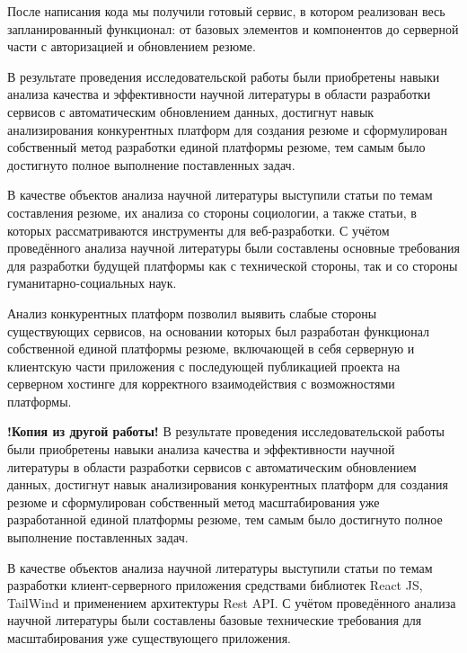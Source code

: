 \documentclass[master, och, diploma]{SCWorks}
\begin{document}
После написания кода мы получили готовый сервис, в котором реализован весь запланированный функционал: от базовых элементов и компонентов до серверной части с авторизацией и обновлением резюме.






\newpage
\conclusion
В результате проведения исследовательской работы были приобретены навыки анализа качества и эффективности научной литературы в области разработки сервисов с автоматическим обновлением данных, достигнут навык анализирования конкурентных платформ для создания резюме и сформулирован собственный метод разработки единой платформы резюме, тем самым было достигнуто полное выполнение поставленных задач.

В качестве объектов анализа научной литературы выступили статьи по темам составления резюме, их анализа со стороны социологии, а также статьи, в которых рассматриваются инструменты для веб-разработки. С учётом проведённого анализа научной литературы были составлены основные требования для разработки будущей платформы как с технической стороны, так и со стороны гуманитарно-социальных наук.

Анализ конкурентных платформ позволил выявить слабые стороны существующих сервисов, на основании которых был разработан функционал собственной единой платформы резюме, включающей в себя серверную и клиентскую части приложения с последующей публикацией проекта на серверном хостинге для корректного взаимодействия с возможностями платформы.

\textbf{!Копия из другой работы!}
В результате проведения исследовательской работы были приобретены навыки анализа качества и эффективности научной литературы в области разработки сервисов с автоматическим обновлением данных, достигнут навык анализирования конкурентных платформ для создания резюме и сформулирован собственный метод масштабирования уже разработанной единой платформы резюме, тем самым было достигнуто полное выполнение поставленных задач. 

В качестве объектов анализа научной литературы выступили статьи по темам разработки клиент-серверного приложения средствами библиотек React JS, TailWind и применением архитектуры Rest API. С учётом проведённого анализа научной литературы были составлены базовые технические требования для масштабирования уже существующего приложения.






%
\end{document}
